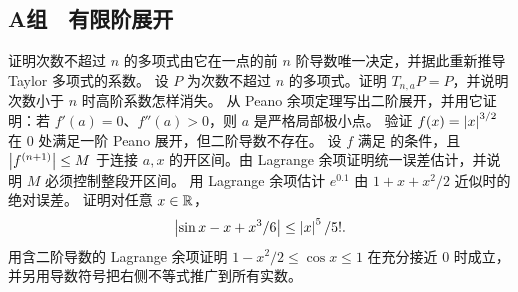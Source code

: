 \subsection*{A组　有限阶展开}
\begin{enumerate}[label=\textbf{\thechapter.\arabic*.}]
  证明次数不超过 \(n\) 的多项式由它在一点的前 \(n\) 阶导数唯一决定，并据此重新推导 Taylor 多项式的系数。
  设 \(P\) 为次数不超过 \(n\) 的多项式。证明 \(T_{n,a}P=P\)，并说明次数小于 \(n\) 时高阶系数怎样消失。
  从 Peano 余项定理写出二阶展开，并用它证明：若 \(f'(a)=0\)、\(f''(a)>0\)，则 \(a\) 是严格局部极小点。
  验证 \(f(x)=\left|x\right|^{3/2}\) 在 \(0\) 处满足一阶 Peano 展开，但二阶导数不存在。
  设 \(f\) 满足  的条件，且 \(\left|f^{(n+1)}\right|\le M\) 于连接 \(a,x\) 的开区间。由 Lagrange 余项证明统一误差估计，并说明 \(M\) 必须控制整段开区间。
  用 Lagrange 余项估计 \(e^{0.1}\) 由 \(1+x+x^2/2\) 近似时的绝对误差。
  证明对任意 \(x\in\mathbb{R}\)，
 \[
  \left|\sin x-x+x^3/6\right|\le\left|x\right|^5/5!.
 \]
  用含二阶导数的 Lagrange 余项证明 \(1-x^2/2\le\cos x\le1\) 在充分接近 \(0\) 时成立，并另用导数符号把右侧不等式推广到所有实数。
\end{enumerate}

